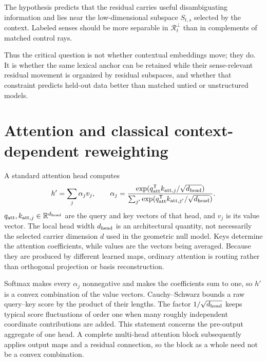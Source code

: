 \documentclass[
  aps,
  reprint,
  superscriptaddress,
  floatfix,
  nofootinbib,
  longbibliography
]{revtex4-2}
\newcommand{\R}{\mathbb{R}}
\newcommand{\T}{^{\mathsf{T}}}
\begin{document}
The hypothesis predicts that the residual carries useful disambiguating
information and lies near the low-dimensional subspace $S_{t,s}$ selected by the
context.  Labeled senses should be more separable in $\mathcal R_t^\perp$ than
in complements of matched control rays.

Thus the critical question is not whether contextual embeddings move; they
do.  It is whether the same lexical anchor can be retained while their
sense-relevant residual movement is organized by residual subspaces, and whether
that constraint predicts held-out data better than matched untied or
unstructured models.

\section{Attention and classical context-dependent reweighting}
\label{sec:attention}

A standard attention head computes
%
\begin{equation}
\label{eq:attention}
h'=\sum_j\alpha_j v_j,
\qquad
\alpha_j=
\frac{\exp(q_{\rm att}\T k_{{\rm att},j}/\sqrt{d_{\rm head}})}
{\sum_{j'}\exp(q_{\rm att}\T k_{{\rm att},j'}/\sqrt{d_{\rm head}})} .
\end{equation}
%
$q_{\rm att},k_{{\rm att},j}\in\R^{d_{\rm head}}$ are the query and key
vectors of that head, and $v_j$ is its value vector.  The local head width
$d_{\rm head}$ is an architectural
quantity, not necessarily the selected carrier dimension $d$ used in the
geometric null model.
Keys determine the attention coefficients, while values are the vectors being
averaged.  Because they are produced by different learned maps, ordinary
attention is routing rather than orthogonal projection or basis
reconstruction.

Softmax makes every $\alpha_j$ nonnegative and makes the coefficients sum to
one, so $h'$ is a convex combination of the value vectors.  Cauchy--Schwarz
bounds a raw query--key score by the product of their lengths.  The factor
$1/\sqrt{d_{\rm head}}$ keeps typical score fluctuations of order one when
many roughly independent coordinate contributions are added.
This statement concerns the pre-output aggregate of one head.  A complete
multi-head attention block subsequently applies output maps and a residual
connection, so the block as a whole need not be a convex combination.
\end{document}
